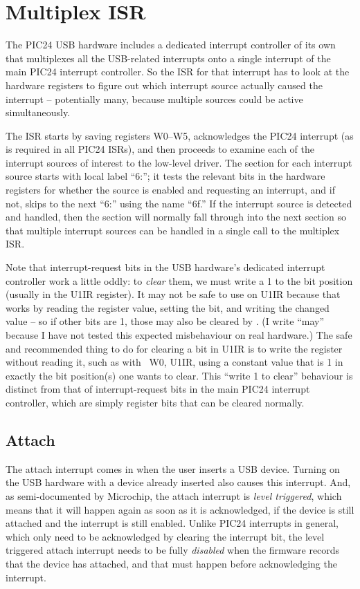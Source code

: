 \section{Multiplex ISR}

The PIC24 USB hardware includes a dedicated interrupt controller of its own
that multiplexes all the USB-related interrupts onto a single interrupt of
the main PIC24 interrupt controller.  So the ISR for that interrupt has to
look at the hardware registers to figure out which interrupt source actually
caused the interrupt -- potentially many, because multiple sources could be
active simultaneously.

The ISR starts by saving registers W0--W5, acknowledges the PIC24 interrupt
(as is required in all PIC24 ISRs), and then proceeds to examine each of the
interrupt sources of interest to the low-level driver.  The section for each
interrupt source starts with local label ``6:''; it tests the relevant bits in
the hardware registers for whether the source is enabled and requesting an
interrupt, and if not, skips to the next ``6:'' using the name ``6f.''  If
the interrupt source is detected and handled, then the section will normally
fall through into the next section so that multiple interrupt sources can be
handled in a single call to the multiplex ISR.

Note that interrupt-request bits in the USB hardware's dedicated interrupt
controller work a little oddly: to \emph{clear} them, we must write a 1 to
the bit position (usually in the U1IR register).  It may not be safe to use
 on U1IR because that works by reading the register value,
setting the bit, and writing the changed value -- so if other bits are 1,
those may also be cleared by .  (I write ``may'' because I have
not tested this expected misbehaviour on real hardware.) The safe and
recommended thing to do for clearing a bit in U1IR is to write the register
without reading it, such as with ~W0, U1IR, using a constant value
that is 1 in exactly the bit position(s) one wants to clear.  This ``write 1
to clear'' behaviour is distinct from that of interrupt-request bits in the
main PIC24 interrupt controller, which are simply register bits that can be
cleared normally.

\subsection{Attach}

The attach interrupt comes in when the user inserts a USB device.  Turning
on the USB hardware with a device already inserted also causes this
interrupt.  And, as semi-documented by Microchip, the attach interrupt is
\emph{level triggered}, which means that it will happen again as soon as it
is acknowledged, if the device is still attached and the interrupt is still
enabled.  Unlike PIC24 interrupts in general, which only need to be
acknowledged by clearing the interrupt bit, the level triggered attach
interrupt needs to be fully \emph{disabled} when the firmware records that
the device has attached, and that must happen before acknowledging the
interrupt.

